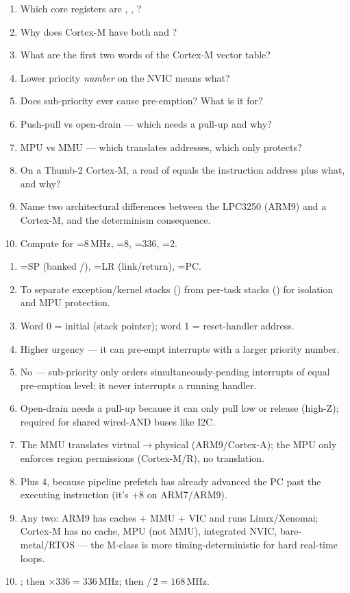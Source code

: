 \begin{scorecard}
\begin{enumerate}
\item Which core registers are , , ?
\item Why does Cortex-M have both  and ?
\item What are the first two words of the Cortex-M vector table?
\item Lower priority \emph{number} on the NVIC means what?
\item Does sub-priority ever cause pre-emption? What is it for?
\item Push-pull vs open-drain --- which needs a pull-up and why?
\item MPU vs MMU --- which translates addresses, which only protects?
\item On a Thumb-2 Cortex-M, a read of  equals the instruction
  address plus what, and why?
\item Name two architectural differences between the LPC3250 (ARM9) and a
  Cortex-M, and the determinism consequence.
\item Compute  for =8\,MHz, =8, =336,
  =2.
\end{enumerate}
\end{scorecard}

\begin{answerkey}
\begin{enumerate}
\item {}=SP (banked /), =LR (link/return),
  =PC.
\item To separate exception/kernel stacks () from per-task stacks
  () for isolation and MPU protection.
\item Word 0 = initial  (stack pointer); word 1 = reset-handler
  address.
\item Higher urgency --- it can pre-empt interrupts with a larger priority
  number.
\item No --- sub-priority only orders simultaneously-pending interrupts of
  equal pre-emption level; it never interrupts a running handler.
\item Open-drain needs a pull-up because it can only pull low or release
  (high-Z); required for shared wired-AND buses like I2C.
\item The MMU translates virtual$\rightarrow$physical (ARM9/Cortex-A); the MPU
  only enforces region permissions (Cortex-M/R), no translation.
\item Plus 4, because pipeline prefetch has already advanced the PC past the
  executing instruction (it's $+8$ on ARM7/ARM9).
\item Any two: ARM9 has caches + MMU + VIC and runs Linux/Xenomai; Cortex-M has
  no cache, MPU (not MMU), integrated NVIC, bare-metal/RTOS --- the M-class is
  more timing-deterministic for hard real-time loops.
\item {}; then $\times 336 = 336$\,MHz; then $/\,2 =
  168$\,MHz.
\end{enumerate}
\end{answerkey}

